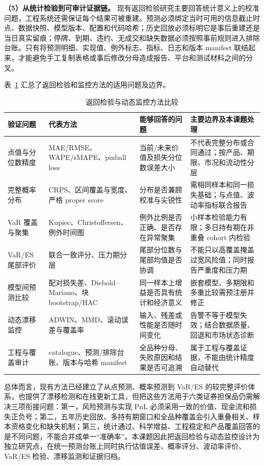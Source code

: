 \textbf{（5）从统计检验到可审计证据链。}
现有返回检验研究主要回答统计意义上的校准问题，工程系统还需保证每个结果可被重建。预测必须绑定当时可用的信息截止时点、数据快照、模型版本、配置和代码哈希；历史回放必须标明它是事后重建还是当日真实留痕；停牌、到期、违约、无成交和缺失数据必须按照事前规则进入排除台账。只有将预测明细、实现值、例外标志、指标、日志和版本 manifest 联结起来，才能避免手工复制表格或事后修改分母造成报告、平台和测试材料之间的分叉。

表~\ref{tab:review-validation-methods} 汇总了返回检验和监控方法的适用问题及边界。

\begin{table}[htbp]
  \centering
  \caption{返回检验与动态监控方法比较}
  \label{tab:review-validation-methods}
  \ReportTableText
  \begin{tabularx}{\textwidth}{@{}p{8em}p{10em}p{10em}X@{}}
    \toprule
    验证问题 & 代表方法 & 能够回答的问题 & 主要边界及本课题处理 \\
    \midrule
    点值与分位数精度 & MAE/RMSE、WAPE/sMAPE、pinball loss & 当前/未来价值及损失分位数误差大小 & 不代表完整分布或合同通过；按产品、期限、市况和流动性分层 \\
    完整概率分布 & CRPS、区间覆盖与宽度、严格 proper score & 分布是否兼顾校准与尖锐性 & 需相同样本和同一损失基础；与点值、波动率指标联合报告 \\
    VaR 覆盖与聚集 & Kupiec、Christoffersen、例外时间图 & 例外比例是否正确、是否存在异常聚集 & 小样本检验能力有限；多日持有期在非重叠 cohort 内检验 \\
    VaR/ES 尾部评价 & 联合一致评分、压力期分层 & 尾部分位数与尾部均值是否协调 & 不能只以高覆盖掩盖过宽风险值；同时报告严重度和压力期 \\
    模型间预测比较 & 配对损失差、Diebold--Mariano、块 bootstrap/HAC & 同一样本上增益是否具有统计和经济意义 & 嵌套模型、多期限和多重比较需预注册并修正 \\
    动态漂移监控 & ADWIN、MMD、滚动误差与覆盖率 & 输入、残差或性能是否随时间变化 & 告警不等于模型失效；结合数据质量、回退和市场状态诊断 \\
    工程与覆盖审计 & catalogue、预测/排除台账、版本与哈希 manifest & 全品种分母、失败原因和结果是否可追溯 & 属于工程与覆盖证据，不能由统计精度自动替代 \\
    \bottomrule
  \end{tabularx}
\end{table}

总体而言，现有方法已经建立了从点预测、概率预测到 VaR/ES 的较完整评价体系，也提供了漂移检测和在线更新工具，但把这些方法用于六类证券担保品仍需解决三项衔接问题：第一，风险预测与实现 PnL 必须采用一致的价值、现金流和损失正负号；第二，五年历史回放、多持有期窗口和全品种覆盖会引入重叠相关、样本资格变化和缺失机制；第三，统计通过、科学增益、工程稳定和产品覆盖回答的是不同问题，不能合并成单一“准确率”。本课题因此把返回检验与动态监控设计为独立研究点，在统一预测台账上同时执行估值误差、概率评分、波动率评价、VaR/ES 检验、漂移监测和证据归档。

